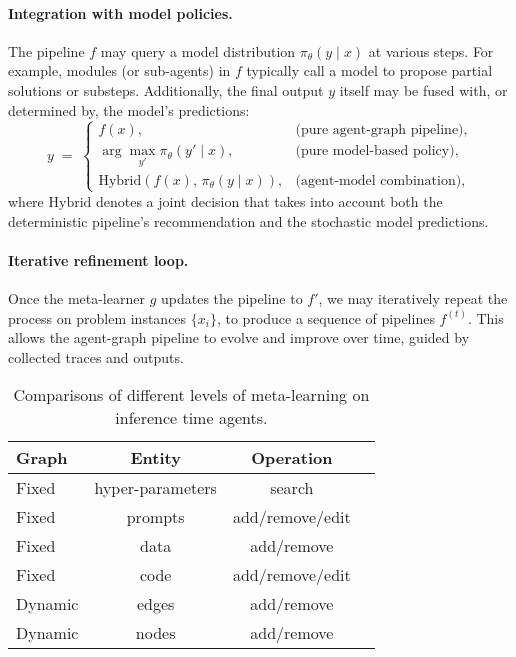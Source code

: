 \paragraph{Integration with model policies.}
The pipeline $f$ may query a model distribution \(\pi_\theta(y \mid x)\) at various steps. For example, modules (or sub-agents) in $f$ typically call a model to propose partial solutions or substeps. Additionally, the final output $y$ itself may be fused with, or determined by, the model's predictions:
\begin{equation}
y \;=\; 
\begin{cases}
f(x), & \text{(pure agent-graph pipeline)}, \\
\arg\max_{y'} \pi_\theta(y' \mid x), & \text{(pure model-based policy)}, \\
\text{Hybrid}(f(x),\, \pi_\theta(y \mid x)), & \text{(agent-model combination)},
\end{cases}
\end{equation}
where $\text{Hybrid}$ denotes a joint decision that takes into account both the deterministic pipeline's recommendation and the stochastic model predictions.

\paragraph{Iterative refinement loop.}
Once the meta-learner $g$ updates the pipeline to $f'$, we may iteratively repeat the process on problem instances $\{x_i\}$, to produce a sequence of pipelines $f^{(t)}$. This allows the agent-graph pipeline to evolve and improve over time, guided by collected traces and outputs.



\begin{table}[h]
\caption{Comparisons of different levels of meta-learning on inference time agents.}
\label{tab:meta}
\vskip 0.15in
\begin{center}
\begin{scriptsize}
\begin{sc}
\begin{tabular}{lccc}
\toprule
Graph & Entity & Operation \\
\midrule
Fixed & hyper-parameters & search \\
Fixed & prompts & add/remove/edit \\
Fixed & data & add/remove \\
Fixed & code & add/remove/edit \\
Dynamic & edges & add/remove \\
Dynamic & nodes & add/remove \\
\bottomrule
\end{tabular}
\end{sc}
\end{scriptsize}
\end{center}
\vskip -0.1in
\end{table}
